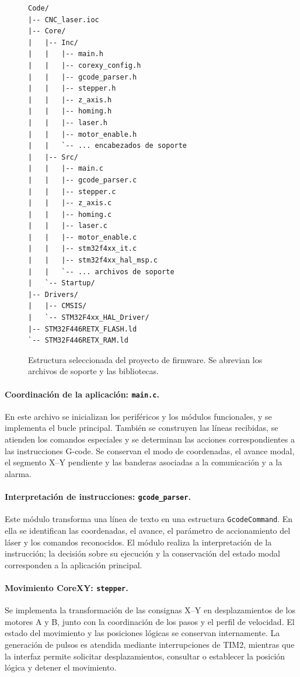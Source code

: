 \documentclass[blue,fullpaper]{ludusofficial}  %
\begin{document}
\begin{figure}[htbp]
    \centering
    \begin{minipage}{0.95\linewidth}
    \small
\begin{verbatim}
Code/
|-- CNC_laser.ioc
|-- Core/
|   |-- Inc/
|   |   |-- main.h
|   |   |-- corexy_config.h
|   |   |-- gcode_parser.h
|   |   |-- stepper.h
|   |   |-- z_axis.h
|   |   |-- homing.h
|   |   |-- laser.h
|   |   |-- motor_enable.h
|   |   `-- ... encabezados de soporte
|   |-- Src/
|   |   |-- main.c
|   |   |-- gcode_parser.c
|   |   |-- stepper.c
|   |   |-- z_axis.c
|   |   |-- homing.c
|   |   |-- laser.c
|   |   |-- motor_enable.c
|   |   |-- stm32f4xx_it.c
|   |   |-- stm32f4xx_hal_msp.c
|   |   `-- ... archivos de soporte
|   `-- Startup/
|-- Drivers/
|   |-- CMSIS/
|   `-- STM32F4xx_HAL_Driver/
|-- STM32F446RETX_FLASH.ld
`-- STM32F446RETX_RAM.ld
\end{verbatim}
    \end{minipage}
    \caption{Estructura seleccionada del proyecto de firmware.
    Se abrevian los archivos de soporte y las bibliotecas.}
    \label{fig:estructura-firmware}
\end{figure}

\paragraph{Coordinación de la aplicación: \texttt{main.c}.}
En este archivo se inicializan los periféricos y los
módulos funcionales, y se implementa el bucle principal.
También se construyen las líneas recibidas, se atienden
los comandos especiales y se determinan las acciones
correspondientes a las instrucciones G-code. Se conservan
el modo de coordenadas, el avance modal, el segmento
X--Y pendiente y las banderas asociadas a la comunicación
y a la alarma.

\paragraph{Interpretación de instrucciones:
\texttt{gcode\_parser}.}
Este módulo transforma una línea de texto en una
estructura \texttt{GcodeCommand}. En ella se identifican
las coordenadas, el avance, el parámetro de accionamiento
del láser y los comandos reconocidos. El módulo realiza
la interpretación de la instrucción; la decisión sobre
su ejecución y la conservación del estado modal
corresponden a la aplicación principal.

\paragraph{Movimiento CoreXY: \texttt{stepper}.}
Se implementa la transformación de las consignas X--Y
en desplazamientos de los motores A y B, junto con la
coordinación de los pasos y el perfil de velocidad.
El estado del movimiento y las posiciones lógicas
se conservan internamente. La generación de pulsos
es atendida mediante interrupciones de TIM2, mientras
que la interfaz permite solicitar desplazamientos,
consultar o establecer la posición lógica y detener
el movimiento.
\end{document}
